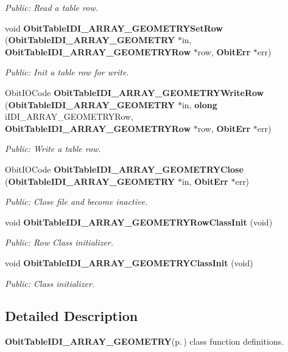 \begin{CompactItemize}
\begin{CompactList}\small\item\em Public: Read a table row. \item\end{CompactList}\item 
void {\bf Obit\-Table\-IDI\_\-ARRAY\_\-GEOMETRYSet\-Row} ({\bf Obit\-Table\-IDI\_\-ARRAY\_\-GEOMETRY} $\ast$in, {\bf Obit\-Table\-IDI\_\-ARRAY\_\-GEOMETRYRow} $\ast$row, {\bf Obit\-Err} $\ast$err)
\begin{CompactList}\small\item\em Public: Init a table row for write. \item\end{CompactList}\item 
Obit\-IOCode {\bf Obit\-Table\-IDI\_\-ARRAY\_\-GEOMETRYWrite\-Row} ({\bf Obit\-Table\-IDI\_\-ARRAY\_\-GEOMETRY} $\ast$in, {\bf olong} i\-IDI\_\-ARRAY\_\-GEOMETRYRow, {\bf Obit\-Table\-IDI\_\-ARRAY\_\-GEOMETRYRow} $\ast$row, {\bf Obit\-Err} $\ast$err)
\begin{CompactList}\small\item\em Public: Write a table row. \item\end{CompactList}\item 
Obit\-IOCode {\bf Obit\-Table\-IDI\_\-ARRAY\_\-GEOMETRYClose} ({\bf Obit\-Table\-IDI\_\-ARRAY\_\-GEOMETRY} $\ast$in, {\bf Obit\-Err} $\ast$err)
\begin{CompactList}\small\item\em Public: Close file and become inactive. \item\end{CompactList}\item 
void {\bf Obit\-Table\-IDI\_\-ARRAY\_\-GEOMETRYRow\-Class\-Init} (void)
\begin{CompactList}\small\item\em Public: Row Class initializer. \item\end{CompactList}\item 
void {\bf Obit\-Table\-IDI\_\-ARRAY\_\-GEOMETRYClass\-Init} (void)
\begin{CompactList}\small\item\em Public: Class initializer. \item\end{CompactList}\end{CompactItemize}


\subsection{Detailed Description}
{\bf Obit\-Table\-IDI\_\-ARRAY\_\-GEOMETRY}{\rm (p.\,\pageref{structObitTableIDI__ARRAY__GEOMETRY})} class function definitions. 

